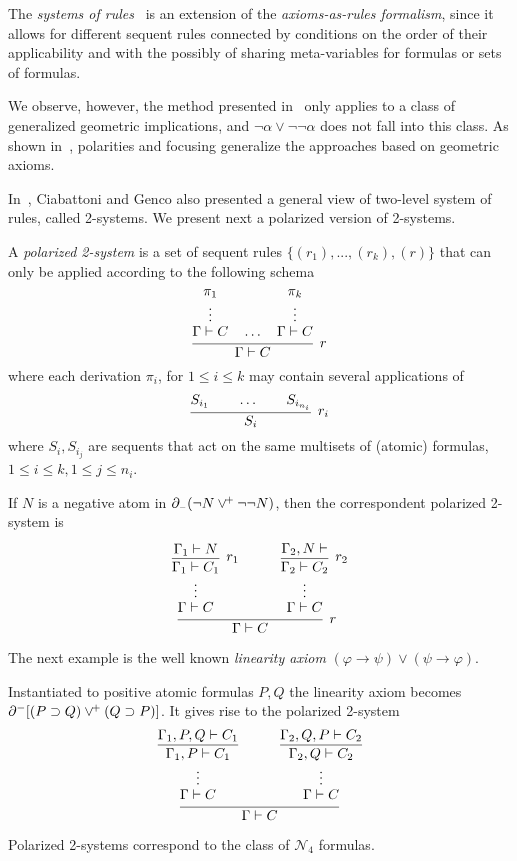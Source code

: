 The {\em
systems of rules}~\cite{Neg16} is an extension of the \emph{axioms-as-rules
formalism}, since it allows for different sequent rules connected by
conditions on the order of their applicability and with the possibly
of sharing meta-variables for formulas or sets of formulas.
%

We observe, however, the method presented in~\cite{Neg16}  only applies to a class of
generalized geometric implications, and $\neg \alpha\vee\neg\neg\alpha$ does not fall into this class. As shown in~\cite{DBLP:journals/apal/MarinMPV22}, polarities and focusing generalize the approaches based on geometric axioms.

In~\cite{DBLP:journals/tocl/CiabattoniG18}, Ciabattoni and Genco also presented a general view of two-level system of rules, called 2-systems. We present next a polarized version of 2-systems.
\begin{definition}
A  {\em polarized 2-system} is a set of sequent rules $\{(r_1), . . . , (r_k ), (r)\}$ that can only be applied according to the following schema
\[
\infer[r]{\Gamma\vdash C}
      {\deduce{\Gamma\vdash C\strut}
              {\deduce{\vdots}
                      {\pi_1}}\quad\ldots\quad
       \deduce{\Gamma\vdash C\strut}
              {\deduce{\vdots}
                      {\pi_k}}}
\]
where each derivation $\pi_i$, for $1\leq i \leq k$ may contain several applications of
\[
\infer[r_i]{S_i}
{S_{i_1}\qquad\ldots\qquad S_{i_{n_i}}}
\]
where $S_i,S_{i_j}$ are sequents that act on the same multisets of (atomic) formulas, $1\leq i\leq k, 1\leq j\leq n_i$. 
\end{definition}
\begin{example}
If $N$ is a negative atom in $\partial_{\scriptscriptstyle -}(\neg N \vee^{\!+} \neg\neg N)$, then the correspondent polarized 2-system is 
\[
\infer[r]{\Gamma\vdash C}
      {\deduce{\Gamma\vdash C\strut}
              {\deduce{\vdots}
                      {\infer[r_1]{\Gamma_1\vdash C_1}{\Gamma_1\vdash N}}}\quad&\quad
       \deduce{\Gamma\vdash C\strut}
              {\deduce{\vdots}
                      {\infer[r_2]{\Gamma_2\vdash C_2}
                             {\deduce{\Gamma_2,N\vdash }{}}}}}
\]
\end{example}
The next example is the well known \emph{linearity axiom} $(\varphi\to \psi)\vee (\psi\to \varphi)$.
\begin{example}\label{ex:linearity}
Instantiated to positive atomic formulas $P,Q$  the linearity axiom becomes $\partial^-[(P\supset Q)\vee^{\!+} (Q\supset P)]$. It gives rise to the polarized 2-system 
\[
\infer{\Gamma\vdash C}
      {\deduce{\Gamma\vdash C\strut}
              {\deduce{\vdots}
                      {\infer{\Gamma_1,P\vdash C_1}{\Gamma_1,P,Q\vdash C_1}}}\quad&\quad
       \deduce{\Gamma\vdash C\strut}
              {\deduce{\vdots}
                             {\infer{\Gamma_2,Q\vdash C_2}{\Gamma_2,Q,P\vdash C_2}}}}
\]
\end{example}
\begin{claim} Polarized 2-systems correspond to the class of
$\mathcal{N}_4$ formulas.
\end{claim}
